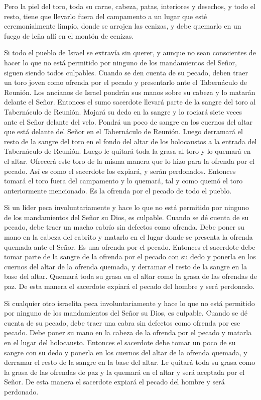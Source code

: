  Pero la piel del toro, toda su carne, cabeza, patas,
interiores y desechos,  y todo el resto, tiene que llevarlo
fuera del campamento a un lugar que esté ceremonialmente limpio, donde
se arrojen las cenizas, y debe quemarlo en un fuego de leña allí en el
montón de cenizas.

 Si todo el pueblo de Israel se extravía sin querer, y
aunque no sean conscientes de hacer lo que no está permitido por ninguno
de los mandamientos del Señor, siguen siendo todos culpables.
 Cuando se den cuenta de su pecado, deben traer un toro
joven como ofrenda por el pecado y presentarlo ante el Tabernáculo de
Reunión.  Los ancianos de Israel pondrán sus manos sobre su
cabeza y lo matarán delante el Señor.  Entonces el sumo
sacerdote llevará parte de la sangre del toro al Tabernáculo de Reunión.
 Mojará su dedo en la sangre y lo rociará siete veces ante
el Señor delante del velo.  Pondrá un poco de sangre en los
cuernos del altar que está delante del Señor en el Tabernáculo de
Reunión. Luego derramará el resto de la sangre del toro en el fondo del
altar de los holocaustos a la entrada del Tabernáculo de Reunión.
 Luego le quitará toda la grasa al toro y lo quemará en el
altar.  Ofrecerá este toro de la misma manera que lo hizo
para la ofrenda por el pecado. Así es como el sacerdote los expiará, y
serán perdonados.  Entonces tomará el toro fuera del
campamento y lo quemará, tal y como quemó el toro anteriormente
mencionado. Es la ofrenda por el pecado de todo el pueblo.

 Si un líder peca involuntariamente y hace lo que no está
permitido por ninguno de los mandamientos del Señor su Dios, es
culpable.  Cuando se dé cuenta de su pecado, debe traer un
macho cabrío sin defectos como ofrenda.  Debe poner su mano
en la cabeza del cabrito y matarlo en el lugar donde se presenta la
ofrenda quemada ante el Señor. Es una ofrenda por el pecado.
 Entonces el sacerdote debe tomar parte de la sangre de la
ofrenda por el pecado con su dedo y ponerla en los cuernos del altar de
la ofrenda quemada, y derramar el resto de la sangre en la base del
altar.  Quemará toda su grasa en el altar como la grasa de
las ofrendas de paz. De esta manera el sacerdote expiará el pecado del
hombre y será perdonado.

 Si cualquier otro israelita peca involuntariamente y hace
lo que no está permitido por ninguno de los mandamientos del Señor su
Dios, es culpable.  Cuando se dé cuenta de su pecado, debe
traer una cabra sin defectos como ofrenda por ese pecado. 
Debe poner su mano en la cabeza de la ofrenda por el pecado y matarla en
el lugar del holocausto.  Entonces el sacerdote debe tomar
un poco de su sangre con su dedo y ponerla en los cuernos del altar de
la ofrenda quemada, y derramar el resto de la sangre en la base del
altar.  Le quitará toda su grasa como la grasa de las
ofrendas de paz y la quemará en el altar y será aceptada por el Señor.
De esta manera el sacerdote expiará el pecado del hombre y será
perdonado.

